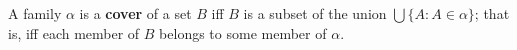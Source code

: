 A family $\alpha$ is a \textbf{cover} of a set $B$ iff $B$ is a subset of the union $\bigcup \{A: A \in \alpha\}$; that is, iff each member of $B$ belongs to some member of $\alpha$.

